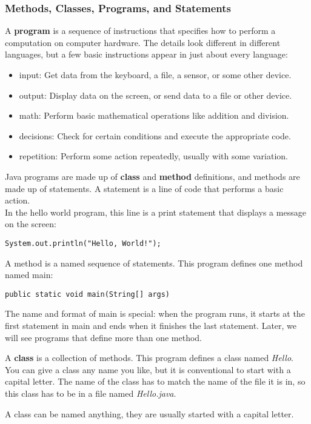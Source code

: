 \documentclass{article}
\begin{document}
\subsubsection{Methods, Classes, Programs, and Statements}
A \textbf{program} is a sequence of instructions that specifies how to perform a computation on computer hardware. 
The details look different in different languages, but a few basic instructions appear in just about every language:
\begin{itemize}
\item input: Get data from the keyboard, a file, a sensor, or some other device.
\item output: Display data on the screen, or send data to a file or other device.
\item math: Perform basic mathematical operations like addition and division.
\item decisions: Check for certain conditions and execute the appropriate code.
\item repetition: Perform some action repeatedly, usually with some variation.
\end{itemize}

Java programs are made up of \textbf{class} and \textbf{method} definitions, and methods are made up of statements. A statement is a line of code that performs a basic action.
\\
In the hello world program, this line is a print statement that displays a message on the screen:
\begin{lstlisting}
System.out.println("Hello, World!");
\end{lstlisting}

A method is a named sequence of statements. This program defines one method named main:
\begin{lstlisting}
public static void main(String[] args) 
\end{lstlisting}
The name and format of main is special: when the program runs, it starts at the first statement in main and ends when it finishes the last statement. Later, we will see programs that define more than one method.

A \textbf{class} is a collection of methods. This program defines a class named \emph{Hello}. You can give a class any name you like, but it is conventional to start with a capital letter. The name of the class has to match the name of the file it is in, so this class has to be in a file named \emph{Hello.java}.

A class can be named anything, they are usually started with a capital letter.
\end{document}
